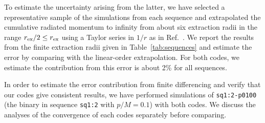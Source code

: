 \documentclass[floats,floatfix,showpacs,amssymb,prd,twocolumn,superscriptaddress,nofootinbib,nolongbibliography,reprint]{revtex4-2}
\newcommand{\mr}[1]{{\textcolor{cyan}{\sf{[MR: #1]}} }}
\newcommand{\us}[1]{{\textcolor{teal}{\sf{[US: #1]}} }}
\begin{document}
To estimate the uncertainty arising from the latter, we have selected a
representative sample of the simulations from each sequence and extrapolated 
the cumulative radiated momentum to infinity from about six extraction
radii in the range $r_{\rm ex}/2 \le r_{\rm ex}$ 
using a Taylor series in $1/r$ as in 
Ref.~\cite{Sperhake:2011zz}. We report the results from the finite 
extraction radii given in Table~\ref{tab:sequences} and estimate the 
error by comparing with the linear-order extrapolation.
For both codes, we estimate the contribution from this error is about
2\% 
for all sequences.

In order to estimate the error contribution from finite differencing and
verify that our codes give consistent results, we have performed simulations
of \texttt{sq1:2-p0100} (the binary in sequence \texttt{sq1:2} with 
$p/M = 0.1$) with both codes. We discuss the analyses of the convergence
of each codes separately before comparing.
\end{document}
